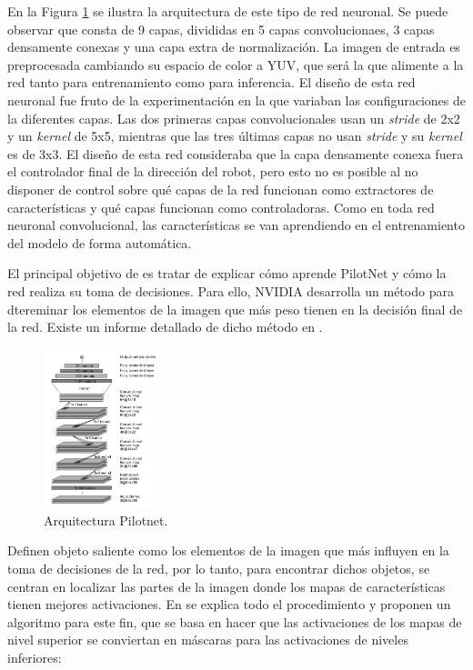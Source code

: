 En la Figura \ref{fig.pilotnet} se ilustra la arquitectura de este tipo de red neuronal. Se puede observar que consta de 9 capas, divididas en 5 capas convolucionaes, 3 capas densamente conexas y una capa extra de normalización. La imagen de entrada es preprocesada cambiando su espacio de color a YUV, que será la que alimente a la red tanto para entrenamiento como para inferencia. El diseño de esta red neuronal fue fruto de la experimentación en la que variaban las configuraciones de la diferentes capas. Las dos primeras capas convolucionales usan un \textit{stride} de 2x2 y un \textit{kernel} de 5x5, mientras que las tres últimas capas no usan \textit{stride} y su \textit{kernel} es de 3x3. El diseño de esta red consideraba que la capa densamente conexa fuera el controlador final de la dirección del robot, pero esto no es posible al no disponer de control sobre qué capas de la red funcionan como extractores de características y qué capas funcionan como controladoras. Como en toda red neuronal convolucional, las características se van aprendiendo en el entrenamiento del modelo de forma automática.

El principal objetivo de \cite{explaining-end2end} es tratar de explicar cómo aprende PilotNet y cómo la red realiza su toma de decisiones. Para ello, NVIDIA desarrolla un método para dtereminar los elementos de la imagen que más peso tienen en la decisión final de la red. Existe un informe detallado de dicho método en \cite{visual}.

\begin{figure}
\begin{center}
	\includegraphics[width=0.3\textwidth]{img/pilotnet.png}
   \caption{Arquitectura Pilotnet.}
	\label{fig.pilotnet}
\end{center}
\end{figure}

Definen objeto saliente como los elementos de la imagen que más influyen en la toma de decisiones de la red, por lo tanto, para encontrar dichos objetos, se centran en localizar las partes de la imagen donde los mapas de características tienen mejores activaciones. En \cite{explaining-end2end} se explica todo el procedimiento y proponen un algoritmo para este fin, que se basa en hacer que las activaciones de los mapas de nivel superior se conviertan en máscaras para las activaciones de niveles inferiores:

